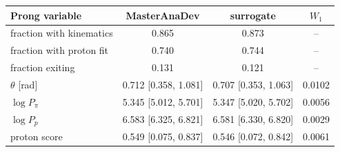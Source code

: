 \begin{tabular}{lccc}
\toprule
Prong variable & MasterAnaDev & surrogate & $W_1$ \\
\midrule
fraction with kinematics & 0.865 & 0.873 & -- \\
fraction with proton fit & 0.740 & 0.744 & -- \\
fraction exiting & 0.131 & 0.121 & -- \\
$\theta$ [rad] & 0.712 [0.358, 1.081] & 0.707 [0.353, 1.063] & 0.0102 \\
$\log P_\pi$ & 5.345 [5.012, 5.701] & 5.347 [5.020, 5.702] & 0.0056 \\
$\log P_p$ & 6.583 [6.325, 6.821] & 6.581 [6.330, 6.820] & 0.0029 \\
proton score & 0.549 [0.075, 0.837] & 0.546 [0.072, 0.842] & 0.0061 \\
\bottomrule
\end{tabular}

